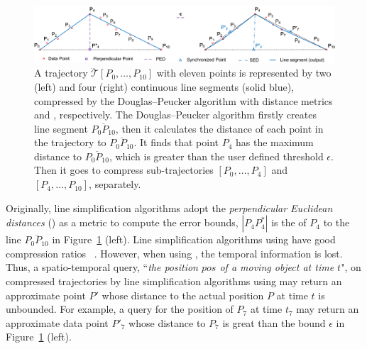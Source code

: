 \begin{figure}[tb!]
\centering
\vspace{-1ex}
\includegraphics[scale=0.76]{figures/Fig-DP.png}
\vspace{-1ex}
\caption{\small A trajectory $\dddot{\mathcal{T}}[P_0, \ldots, P_{10}]$  with eleven points is represented by two (left) and four (right) continuous line segments (solid blue), compressed by the Douglas--Peucker algorithm \cite{Douglas:Peucker} with distance metrics \ped and \sed, respectively.
The Douglas--Peucker algorithm firstly creates line segment $\overline{P_0P_{10}}$, then it calculates the distance of each point in the trajectory to $\overline{P_0P_{10}}$. It finds that point $P_{4}$ has the maximum distance to $\overline{P_0P_{10}}$, which is greater than the user defined threshold $\epsilon$. Then it goes to compress sub-trajectories $[P_0, \ldots, P_{4}]$ and $[P_{4}, \ldots, P_{10}]$, separately.
}
\vspace{-2ex}
\label{fig:notations}
\end{figure}


Originally, line simplification algorithms adopt the \emph{perpendicular Euclidean distances} (\ped) as a metric to compute the error bounds,
\eg $|P_4P^*_4|$ is the \ped of $P_4$ to the line $\overline{P_0P_{10}}$ in Figure~\ref{fig:notations} (left).
Line simplification algorithms using \ped have good compression ratios~ \cite{Douglas:Peucker, Hershberger:Speeding, Liu:BQS, Muckell:Compression, Chen:Trajectory, Cao:Spatio, Shi:Survey}.  However, when using \ped, the temporal information is lost. Thus, a spatio-temporal query, \eg ``\emph{the position $pos$ of a moving object at time $t$}", on  compressed trajectories by line simplification algorithms using \ped may return an approximate point $P'$ whose distance to the actual position $P$ at time $t$ is unbounded. For example, a query for the position of $P_7$ at time $t_7$ may return an approximate data point $P'_7$ whose distance to $P_7$ is great than the  bound $\epsilon$ in Figure~\ref{fig:notations} (left).


